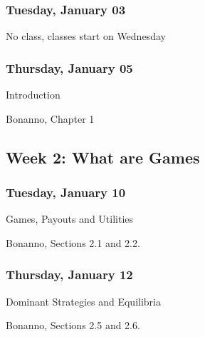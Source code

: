 \documentclass[
]{article}
\providecommand{\tightlist}{%
  \setlength{\itemsep}{0pt}\setlength{\parskip}{0pt}}
\begin{document}
\begin{multicols}{2}

\hypertarget{tuesday-january-03}{%
\subsubsection{Tuesday, January 03}\label{tuesday-january-03}}

No class, classes start on Wednesday

\columnbreak

\hypertarget{thursday-january-05}{%
\subsubsection{Thursday, January 05}\label{thursday-january-05}}

\begin{description}
\tightlist
\item[Topic]
Introduction
\item[Reading]
Bonanno, Chapter 1
\end{description}

\end{multicols}

\hypertarget{week-2-what-are-games}{%
\subsection{Week 2: What are Games}\label{week-2-what-are-games}}

\begin{multicols}{2}

\hypertarget{tuesday-january-10}{%
\subsubsection{Tuesday, January 10}\label{tuesday-january-10}}

\begin{description}
\tightlist
\item[Topic]
Games, Payouts and Utilities
\item[Reading]
Bonanno, Sections 2.1 and 2.2.
\end{description}

\hypertarget{thursday-january-12}{%
\subsubsection{Thursday, January 12}\label{thursday-january-12}}

\begin{description}
\tightlist
\item[Topic]
Dominant Strategies and Equilibria
\item[Reading]
Bonanno, Sections 2.5 and 2.6.
\end{description}

\end{multicols}
\end{document}
